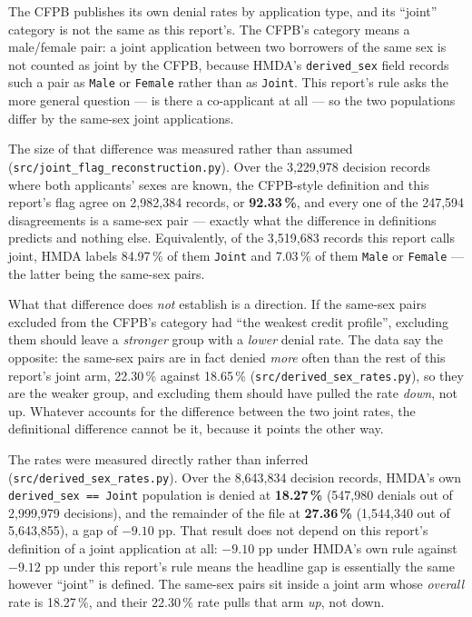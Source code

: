 \documentclass[sigconf,balance=false]{acmart}
\begin{document}
The CFPB publishes its own denial rates by application type, and its
``joint'' category is not the same as this report's. The CFPB's category
means a male/female pair: a joint application between two borrowers of the
same sex is not counted as joint by the CFPB, because HMDA's
\texttt{derived\_\allowbreak sex} field records such a pair as \texttt{Male}
or \texttt{Female} rather than as \texttt{Joint}. This report's rule asks
the more general question --- is there a co-applicant at all --- so the two
populations differ by the same-sex joint applications.

The size of that difference was measured rather than assumed
(\texttt{src/joint\_\allowbreak flag\_\allowbreak reconstruction.py}). Over
the 3{,}229{,}978 decision records where both applicants' sexes are known,
the CFPB-style definition and this report's flag agree on 2{,}982{,}384
records, or \textbf{92.33\,\%}, and every one of the 247{,}594
disagreements is a same-sex pair --- exactly what the difference in
definitions predicts and nothing else. Equivalently, of the 3{,}519{,}683
records this report calls joint, HMDA labels 84.97\,\% of them
\texttt{Joint} and 7.03\,\% of them \texttt{Male} or \texttt{Female} ---
the latter being the same-sex pairs.

What that difference does \emph{not} establish is a direction. If the
same-sex pairs excluded from the CFPB's category had ``the weakest credit
profile'', excluding them should leave a \emph{stronger} group with a
\emph{lower} denial rate. The data say the opposite: the same-sex pairs
are in fact denied \emph{more} often than the rest of this report's joint
arm, 22.30\,\% against 18.65\,\%
(\texttt{src/derived\_\allowbreak sex\_\allowbreak rates.py}), so they are
the weaker group, and excluding them should have pulled the rate
\emph{down}, not up. Whatever accounts for the difference between the two
joint rates, the definitional difference cannot be it, because it points
the other way.

The rates were measured directly rather than inferred
(\texttt{src/derived\_\allowbreak sex\_\allowbreak rates.py}). Over the
8{,}643{,}834 decision records, HMDA's own \texttt{derived\_\allowbreak sex
== Joint} population is denied at \textbf{18.27\,\%} (547{,}980 denials out
of 2{,}999{,}979 decisions), and the remainder of the file at
\textbf{27.36\,\%} (1{,}544{,}340 out of 5{,}643{,}855), a gap of
$-9.10$ pp. That result does not depend on this report's definition of a
joint application at all: $-9.10$ pp under HMDA's own rule against $-9.12$
pp under this report's rule means the headline gap is essentially the same
however ``joint'' is defined. The same-sex pairs sit inside a joint arm
whose \emph{overall} rate is 18.27\,\%, and their 22.30\,\% rate pulls
that arm \emph{up}, not down.
\end{document}
